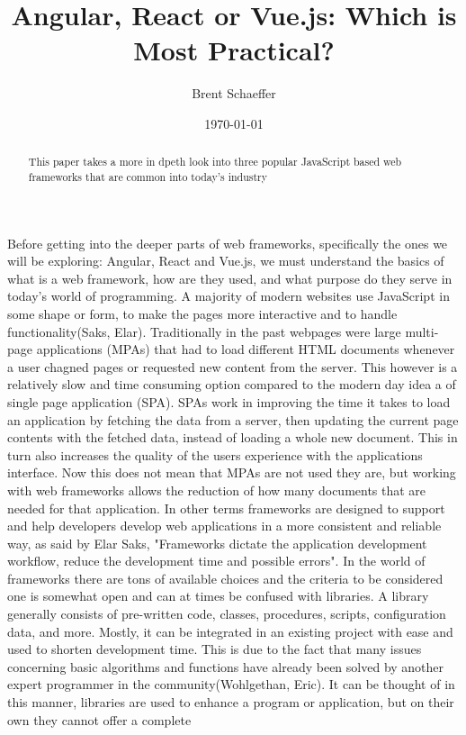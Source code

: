 \documentclass[11pt]{article}
\title{Angular, React or Vue.js: Which is Most Practical?}
\author{Brent Schaeffer}
\date{\today}
\begin{document}
\maketitle

\begin{abstract}
    This paper takes a more in dpeth look into three popular JavaScript based web frameworks that are common into today's industry
\end{abstract}


Before getting into the deeper parts of web frameworks, specifically the ones we will be
exploring: Angular, React and Vue.js, we must understand the basics of what is a web framework,
how are they used, and what purpose do they serve in today's world of programming. 
A majority of modern websites use JavaScript in some shape or form, to make the pages more
interactive and to handle functionality(Saks, Elar). Traditionally in the past webpages were large multi-page applications (MPAs)
that had to load different HTML documents whenever a user chagned pages or requested new content from the server.
This however is a relatively slow and time consuming option compared to the modern day idea a of single page application
(SPA). SPAs work in improving the time it takes to load an application by fetching the data from a server, 
then updating the current page contents with the fetched data, instead of loading a whole new document. 
This in turn also increases the quality of the users experience with the applications interface. Now this does not mean
that MPAs are not used they are, but working with web frameworks allows the reduction of how many documents that are 
needed for that application. In other terms frameworks are designed to support and help developers develop web applications
in a more consistent and reliable way, as said by Elar Saks, "Frameworks dictate the application development workflow, reduce the development time and
possible errors". In the world of frameworks there are tons of available choices and the criteria to be considered one is somewhat open and can at times
be confused with libraries. A library generally consists of pre-written code, classes, procedures, scripts, configuration data, and more.
Mostly, it can be integrated in an existing project with ease and used to shorten development time. This is due to the fact that many 
issues concerning basic algorithms and functions have already been solved by another expert programmer in the community(Wohlgethan, Eric).
It can be thought of in this manner, libraries are used to enhance a program or application, but on their own they cannot offer a complete 
\end{document}
